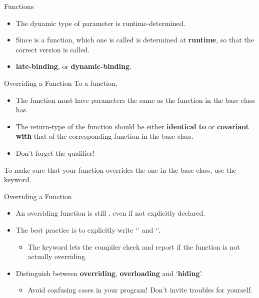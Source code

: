 \documentclass{beamer}
\begin{document}
\begin{frame}{\virtual Functions}
    \begin{itemize}
        \item The dynamic type of parameter  is runtime-determined.
        \item Since  is a \virtual function, which one is called is determined at \textbf{runtime}, so that the correct version is called.
        \item \textbf{late-binding}, or \textbf{dynamic-binding}.
    \end{itemize}
\end{frame}

\begin{frame}{Overriding a \virtual Function}
    To \override a \virtual function,
    \begin{itemize}
        \item The function must have parameters the same as the function in the base class has.
        \item The return-type of the function should be either \textbf{identical to} or \textbf{covariant with}  that of the corresponding function in the base class.
        \item Don't forget the \const qualifier!
    \end{itemize}
    To make sure that your function overrides the one in the base class, use the \override keyword.
\end{frame}

\begin{frame}{Overriding a \virtual Function}
    \begin{itemize}
        \item An overriding function is still , even if not explicitly declared.
        \item The best practice is to explicitly write `' and `'.
        \begin{itemize}
            \item The \override keyword lets the compiler check and report if the function is not actually overriding.
        \end{itemize}
        \item Distinguish between \textbf{overriding}, \textbf{overloading} and `\textbf{hiding}'.
        \begin{itemize}
            \item Avoid confusing cases in your program! Don't invite troubles for yourself.
        \end{itemize}
    \end{itemize}
\end{frame}
\end{document}
